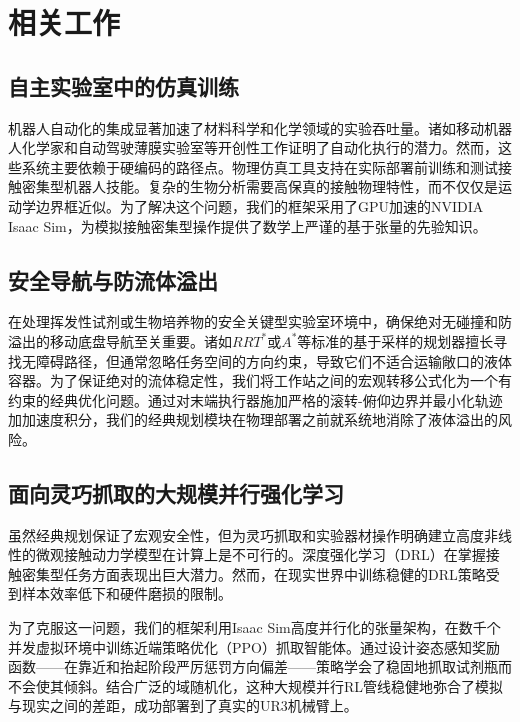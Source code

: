 \section{相关工作}
\label{sec:related_work}

\subsection{自主实验室中的仿真训练}
机器人自动化的集成显著加速了材料科学和化学领域的实验吞吐量。诸如移动机器人化学家\cite{burger2020mobile}和自动驾驶薄膜实验室\cite{macleod2020self}等开创性工作证明了自动化执行的潜力。然而，这些系统主要依赖于硬编码的路径点。物理仿真工具支持在实际部署前训练和测试接触密集型机器人技能。复杂的生物分析需要高保真的接触物理特性，而不仅仅是运动学边界框近似。为了解决这个问题，我们的框架采用了GPU加速的NVIDIA Isaac Sim\cite{makoviychuk2021isaac}，为模拟接触密集型操作提供了数学上严谨的基于张量的先验知识。

\subsection{安全导航与防流体溢出}
在处理挥发性试剂或生物培养物的安全关键型实验室环境中，确保绝对无碰撞和防溢出的移动底盘导航至关重要。诸如$RRT^{*}$或$A^{*}$等标准的基于采样的规划器擅长寻找无障碍路径，但通常忽略任务空间的方向约束，导致它们不适合运输敞口的液体容器。为了保证绝对的流体稳定性，我们将工作站之间的宏观转移公式化为一个有约束的经典优化问题。通过对末端执行器施加严格的滚转-俯仰边界并最小化轨迹加加速度积分，我们的经典规划模块在物理部署之前就系统地消除了液体溢出的风险。

\subsection{面向灵巧抓取的大规模并行强化学习}
虽然经典规划保证了宏观安全性，但为灵巧抓取和实验器材操作明确建立高度非线性的微观接触动力学模型在计算上是不可行的。深度强化学习（DRL）在掌握接触密集型任务方面表现出巨大潜力\cite{johannink2019residual}。然而，在现实世界中训练稳健的DRL策略受到样本效率低下和硬件磨损的限制。

为了克服这一问题，我们的框架利用Isaac Sim高度并行化的张量架构，在数千个并发虚拟环境中训练近端策略优化（PPO）抓取智能体。通过设计姿态感知奖励函数——在靠近和抬起阶段严厉惩罚方向偏差——策略学会了稳固地抓取试剂瓶而不会使其倾斜。结合广泛的域随机化，这种大规模并行RL管线稳健地弥合了模拟与现实之间的差距，成功部署到了真实的UR3机械臂上。
